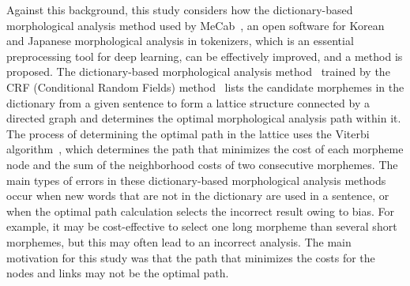 \documentclass[AMS,STIX2COL]{WileyNJD-v2}
\begin{document}
    Against this background, this study considers how the dictionary-based morphological analysis method used by MeCab~\cite{MeCab}, an open software for Korean and Japanese morphological analysis in tokenizers, which is an essential preprocessing tool for deep learning, can be effectively improved, and a method is proposed.
    The dictionary-based morphological analysis method~\cite{Kudo2004, NaSH2014, NaSH2015, NaSH2018} trained by the CRF (Conditional Random Fields) method~\cite{Lafferty2001} lists the candidate morphemes in the dictionary from a given sentence to form a lattice structure connected by a directed graph and determines the optimal morphological analysis path within it.
    The process of determining the optimal path in the lattice uses the Viterbi algorithm~\cite{Viterbi1967}, which determines the path that minimizes the cost of each morpheme node and the sum of the neighborhood costs of two consecutive morphemes.
    The main types of errors in these dictionary-based morphological analysis methods occur when new words that are not in the dictionary are used in a sentence, or when the optimal path calculation selects the incorrect result owing to bias.
    For example, it may be cost-effective to select one long morpheme than several short morphemes, but this may often lead to an incorrect analysis.
    The main motivation for this study was that the path that minimizes the costs for the nodes and links may not be the optimal path.
\end{document}
